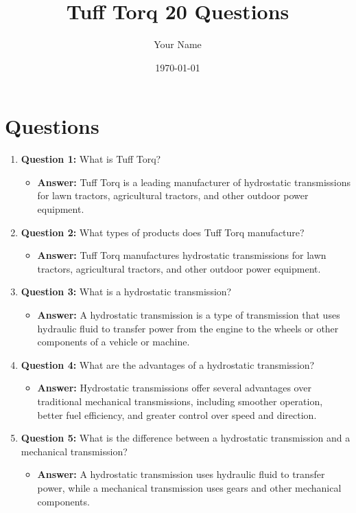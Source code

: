 \documentclass{article}
\begin{document}
\title{Tuff Torq 20 Questions}
\author{Your Name}
\date{\today}
\maketitle

\section{Questions}

\begin{enumerate}
    \item \textbf{Question 1:} What is Tuff Torq?
    \begin{itemize}
        \item \textbf{Answer:} Tuff Torq is a leading manufacturer of hydrostatic transmissions for lawn tractors, agricultural tractors, and other outdoor power equipment.
    \end{itemize}
    
    \item \textbf{Question 2:} What types of products does Tuff Torq manufacture?
    \begin{itemize}
        \item \textbf{Answer:} Tuff Torq manufactures hydrostatic transmissions for lawn tractors, agricultural tractors, and other outdoor power equipment.
    \end{itemize}
    
    \item \textbf{Question 3:} What is a hydrostatic transmission?
    \begin{itemize}
        \item \textbf{Answer:} A hydrostatic transmission is a type of transmission that uses hydraulic fluid to transfer power from the engine to the wheels or other components of a vehicle or machine.
    \end{itemize}
    
    \item \textbf{Question 4:} What are the advantages of a hydrostatic transmission?
    \begin{itemize}
        \item \textbf{Answer:} Hydrostatic transmissions offer several advantages over traditional mechanical transmissions, including smoother operation, better fuel efficiency, and greater control over speed and direction.
    \end{itemize}
    
    \item \textbf{Question 5:} What is the difference between a hydrostatic transmission and a mechanical transmission?
    \begin{itemize}
        \item \textbf{Answer:} A hydrostatic transmission uses hydraulic fluid to transfer power, while a mechanical transmission uses gears and other mechanical components.
    \end{itemize}
    

\end{enumerate}
\end{document}
